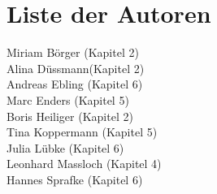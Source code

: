 \chapter*{Liste der Autoren}
Miriam Börger (Kapitel 2)\\
Alina Düssmann(Kapitel 2)\\
Andreas Ebling (Kapitel 6)\\
Marc Enders (Kapitel 5)\\
Boris Heiliger (Kapitel 2)\\
Tina Koppermann (Kapitel 5)\\
Julia Lübke (Kapitel 6)\\
Leonhard Massloch (Kapitel 4)\\
Hannes Sprafke (Kapitel 6)\\
